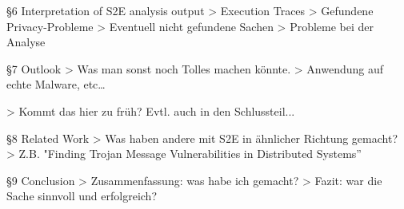 §6	Interpretation of S2E analysis output
		> Execution Traces
		> Gefundene Privacy-Probleme
		> Eventuell nicht gefundene Sachen
		> Probleme bei der Analyse

§7	Outlook
		> Was man sonst noch Tolles machen könnte.
		> Anwendung auf echte Malware, etc…

		> Kommt das hier zu früh? Evtl. auch in den Schlussteil...

§8	Related Work
		> Was haben andere mit S2E in ähnlicher Richtung gemacht?
		> Z.B. "Finding Trojan Message Vulnerabilities in Distributed Systems”

§9	Conclusion
		> Zusammenfassung: was habe ich gemacht?
		> Fazit: war die Sache sinnvoll und erfolgreich?
\fi






